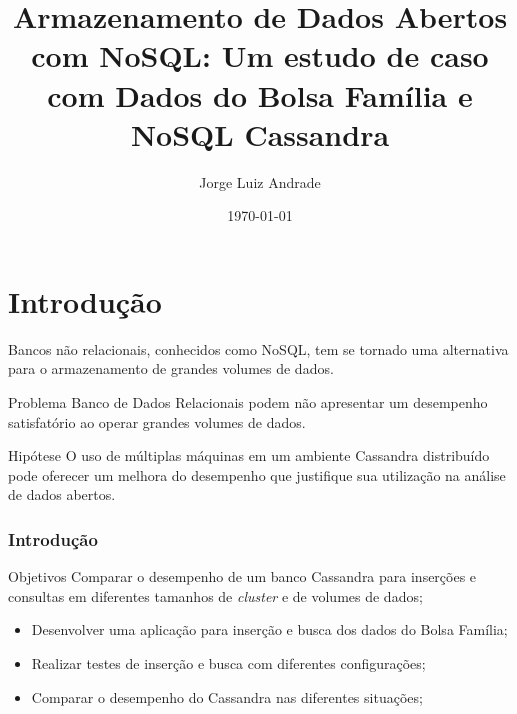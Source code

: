 \documentclass[brazil]{beamer}
\title[Bolsa Família e Cassandra]{Armazenamento de Dados Abertos com NoSQL: Um estudo de caso com Dados do Bolsa Família e NoSQL Cassandra} %
\author{Jorge Luiz Andrade} %
\institute[UnB] %
{
Universidade de Brasília \\ %
\medskip
\textit{jorgeluizandrade@outlook.com} %
}
\date{\today} %
\begin{document}
\begin{frame}
\titlepage %
\end{frame}



\section{Introdução} 

\begin{frame}
Bancos não relacionais, conhecidos como NoSQL, tem se tornado uma alternativa para o armazenamento de grandes volumes de dados.
	
\begin{block}{Problema}
	Banco de Dados Relacionais podem não apresentar um desempenho satisfatório ao operar grandes volumes de dados.
\end{block}

\begin{block}{Hipótese}
	O uso de múltiplas máquinas em um ambiente Cassandra distribuído pode oferecer um melhora do desempenho que justifique sua utilização na análise de dados abertos.	
\end{block}

\end{frame}

\begin{frame}
\frametitle{Introdução}

\begin{block}{Objetivos}
	Comparar o desempenho de um banco Cassandra para inserções e consultas em diferentes tamanhos de \emph{cluster} e de volumes de dados;
	
	\begin{itemize}
		\item Desenvolver uma aplicação para inserção e busca dos dados do Bolsa Família;
		\item Realizar testes de inserção e busca com diferentes configurações;
		\item Comparar o desempenho do Cassandra nas diferentes situações;
	\end{itemize}
\end{block}
\end{frame}
\end{document}
